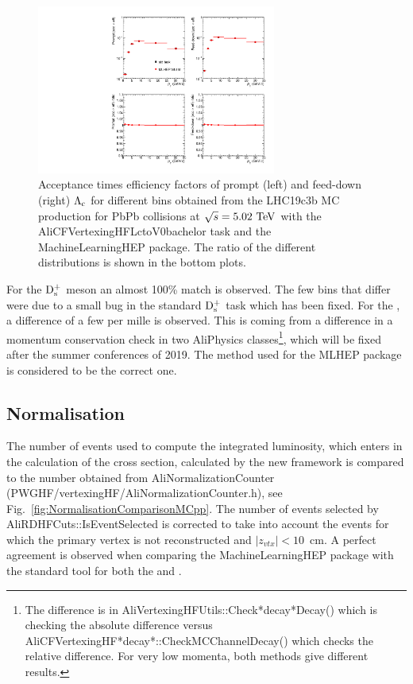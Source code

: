\begin{figure}[tb]
\begin{center}
\includegraphics[width=0.7\textwidth]{figures/LcEfficiencyComparison.pdf}
\caption{Acceptance times efficiency factors of prompt (left) and feed-down (right) $\mbox{$\mathrm {\Lambda_{c}}$}$ for different \pt bins obtained from the LHC19c3b MC production for PbPb collisions at $\sqrt{s}=5.02~\mathrm{TeV}$ with the AliCFVertexingHFLctoV0bachelor task and the MachineLearningHEP package. The ratio of the different distributions is shown in the bottom plots. }
\label{fig:EffLcComparisonMCPbPb}
\end{center}
\end{figure}

For the $\rm D_s^+$ meson an almost 100\% match is observed. The few bins that differ were due to a small bug in the standard $\rm D_s^+$ task which has been fixed. For the \Lc, a difference of a few per mille is observed. This is coming from a difference in a momentum conservation check in two AliPhysics classes\footnote{The difference is in AliVertexingHFUtils::Check*decay*Decay() which is checking the absolute difference versus AliCFVertexingHF*decay*::CheckMCChannelDecay() which checks the relative difference. For very low momenta, both methods give different results.}, which will be fixed after the summer conferences of 2019. The method used for the MLHEP package is considered to be the correct one.

\subsection{Normalisation}
\label{subsec:normValidation}

The number of events used to compute the integrated luminosity, which enters in the calculation of the cross section, calculated by the new framework is compared to the number obtained from AliNormalizationCounter (PWGHF/vertexingHF/AliNormalizationCounter.h), see Fig.~\ref{fig:NormalisationComparisonMCpp}. The number of events selected by AliRDHFCuts::IsEventSelected is corrected to take into account the events for which the primary vertex is not reconstructed and $|z_{vtx}|<10$~cm. A perfect agreement is observed when comparing the MachineLearningHEP package with the standard tool for both the \Ds and \Lc.
 
